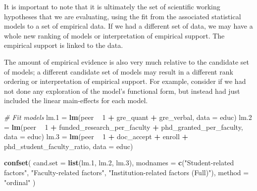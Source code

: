 \documentclass[]{book}
\newenvironment{Shaded}{\begin{snugshade}}{\end{snugshade}}
\newcommand{\CommentTok}[1]{\textcolor[rgb]{0.56,0.35,0.01}{\textit{#1}}}
\newcommand{\DataTypeTok}[1]{\textcolor[rgb]{0.13,0.29,0.53}{#1}}
\newcommand{\DecValTok}[1]{\textcolor[rgb]{0.00,0.00,0.81}{#1}}
\newcommand{\FloatTok}[1]{\textcolor[rgb]{0.00,0.00,0.81}{#1}}
\newcommand{\KeywordTok}[1]{\textcolor[rgb]{0.13,0.29,0.53}{\textbf{#1}}}
\newcommand{\NormalTok}[1]{#1}
\newcommand{\OperatorTok}[1]{\textcolor[rgb]{0.81,0.36,0.00}{\textbf{#1}}}
\newcommand{\StringTok}[1]{\textcolor[rgb]{0.31,0.60,0.02}{#1}}
\begin{document}
It is important to note that it is ultimately the set of scientific working hypotheses that we are evaluating, using the fit from the associated statistical models to a set of empirical data. If we had a different set of data, we may have a whole new ranking of models or interpretation of empirical support. The empirical support is linked to the data.

The amount of empirical evidence is also very much relative to the candidate set of models; a different candidate set of models may result in a different rank ordering or interpretation of empirical support. For example, consider if we had not done any exploration of the model's functional form, but instead had just included the linear main-effects for each model.

\begin{Shaded}
\begin{Highlighting}[]
\CommentTok{# Fit models}
\NormalTok{lm}\FloatTok{.1}\NormalTok{ =}\StringTok{ }\KeywordTok{lm}\NormalTok{(peer }\OperatorTok{~}\StringTok{ }\DecValTok{1} \OperatorTok{+}\StringTok{ }\NormalTok{gre_quant }\OperatorTok{+}\StringTok{ }\NormalTok{gre_verbal, }\DataTypeTok{data =}\NormalTok{ educ)}
\NormalTok{lm}\FloatTok{.2}\NormalTok{ =}\StringTok{ }\KeywordTok{lm}\NormalTok{(peer }\OperatorTok{~}\StringTok{ }\DecValTok{1} \OperatorTok{+}\StringTok{ }\NormalTok{funded_research_per_faculty }\OperatorTok{+}\StringTok{ }\NormalTok{phd_granted_per_faculty, }\DataTypeTok{data =}\NormalTok{ educ)}
\NormalTok{lm}\FloatTok{.3}\NormalTok{ =}\StringTok{ }\KeywordTok{lm}\NormalTok{(peer }\OperatorTok{~}\StringTok{ }\DecValTok{1} \OperatorTok{+}\StringTok{ }\NormalTok{doc_accept }\OperatorTok{+}\StringTok{ }\NormalTok{enroll }\OperatorTok{+}\StringTok{ }\NormalTok{phd_student_faculty_ratio, }\DataTypeTok{data =}\NormalTok{ educ)}

\KeywordTok{confset}\NormalTok{(}
  \DataTypeTok{cand.set =} \KeywordTok{list}\NormalTok{(lm}\FloatTok{.1}\NormalTok{, lm}\FloatTok{.2}\NormalTok{, lm}\FloatTok{.3}\NormalTok{),}
  \DataTypeTok{modnames =} \KeywordTok{c}\NormalTok{(}\StringTok{"Student-related factors"}\NormalTok{, }\StringTok{"Faculty-related factors"}\NormalTok{, }\StringTok{"Institution-related factors (Full)"}\NormalTok{),}
  \DataTypeTok{method =} \StringTok{"ordinal"}
\NormalTok{  )}
\end{Highlighting}
\end{Shaded}
\end{document}
